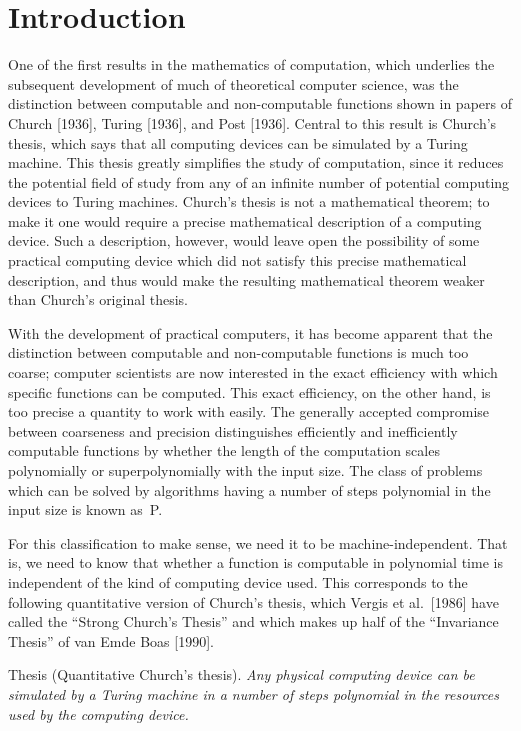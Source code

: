 \section{Introduction}
One of the first results in the mathematics of computation, which underlies 
the subsequent development of much of theoretical computer science, 
was the distinction between computable and non-computable functions
shown in papers of Church [1936], Turing [1936], and Post [1936].
Central to this result is Church's thesis, 
which says that all computing devices can be simulated by a 
Turing machine.  This thesis greatly simplifies the study of
computation, since it reduces the potential field of study from
any of an infinite number of potential computing devices to 
Turing machines.  Church's thesis is not a 
mathematical theorem; to make it one would require a
precise mathematical description of a computing device.
Such a description, however, would leave open the possibility of 
some practical computing
device which did not satisfy this precise mathematical description, and thus
would make the resulting
mathematical theorem weaker than Church's original thesis.

With the development of practical computers, it has become apparent
that the distinction between computable and non-computable functions 
is much too coarse; computer scientists are now interested in 
the exact efficiency with which specific functions can be computed.  This
exact efficiency, on the other hand, is too precise a quantity to
work with easily.  The generally accepted
compromise between coarseness and precision distinguishes 
efficiently and inefficiently computable functions by whether 
the length of the computation scales polynomially or superpolynomially 
with the input size.  The class of problems which can be
solved by algorithms having a number of steps polynomial in the
input size is known as~P.  

For this classification to make sense, we need it to be machine-independent.
That is, we need to know that whether a function
is computable in polynomial time is independent of the kind of computing 
device used.  This corresponds to the following quantitative 
version of Church's thesis, which
Vergis et al.\ [1986] have called the ``Strong Church's Thesis'' and 
which makes up half of the ``Invariance Thesis'' of van Emde Boas [1990].

{\sc Thesis {\rm (Quantitative Church's thesis).}} 
{\it 
Any physical computing 
device can be simulated by a Turing machine in a number of steps 
polynomial in the resources used by the computing device.}

